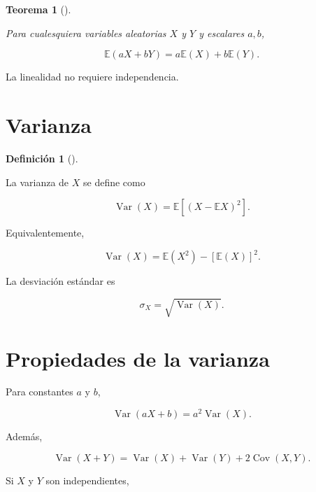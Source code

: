 \documentclass[
  spanish,
  10.5pt,
  letterpaper,
  DIV=11,
  numbers=noendperiod,
  oneside,
  open=any]{scrreprt}
\theoremstyle{definition}
\newtheorem{definition}{Definición}[chapter]
\theoremstyle{definition}
\theoremstyle{plain}
\newtheorem{theorem}{Teorema}[chapter]
\theoremstyle{remark}
\begin{document}

\begin{theorem}[]\protect\hypertarget{thm-linealidad-esperanza}{}\label{thm-linealidad-esperanza}

Para cualesquiera variables aleatorias \(X\) y \(Y\) y escalares
\(a,b\),

\[
\mathbb{E}(aX+bY)
=
a\mathbb{E}(X)
+
b\mathbb{E}(Y).
\]

\end{theorem}

La linealidad no requiere independencia.

\section*{Varianza}\label{varianza}


\begin{definition}[]\protect\hypertarget{def-varianza}{}\label{def-varianza}

La varianza de \(X\) se define como

\[
\operatorname{Var}(X)
=
\mathbb{E}
\left[
(X-\mathbb{E}X)^2
\right].
\]

\end{definition}

Equivalentemente,

\[
\operatorname{Var}(X)
=
\mathbb{E}(X^2)
-
[\mathbb{E}(X)]^2.
\]

La desviación estándar es

\[
\sigma_X
=
\sqrt{
\operatorname{Var}(X)
}.
\]

\section*{Propiedades de la varianza}\label{propiedades-de-la-varianza}


Para constantes \(a\) y \(b\),

\[
\operatorname{Var}(aX+b)
=
a^2\operatorname{Var}(X).
\]

Además,

\[
\operatorname{Var}(X+Y)
=
\operatorname{Var}(X)
+
\operatorname{Var}(Y)
+
2\operatorname{Cov}(X,Y).
\]

Si \(X\) y \(Y\) son independientes,
\end{document}
